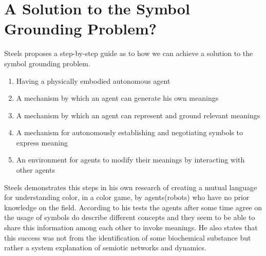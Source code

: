 \documentclass{article}
\begin{document}
	\section{A Solution to the Symbol Grounding Problem?}
	Steels proposes a step-by-step guide as to how we can achieve a solution to the symbol grounding problem.
	\begin{enumerate}
		\item Having a physically embodied autonomous agent
		\item A mechanism by which an agent can generate his own meanings
		\item A mechanism by which an agent can represent and ground relevant meanings
		\item A mechanism for autonomously establishing and negotiating symbols to express meaning
		\item An environment for agents to modify their meanings by interacting with other agents
	\end{enumerate}
	Steels demonstrates this steps in his own research of creating a mutual language for understanding color, in a color game, by agents(robots) who have no prior knowledge on the field. According to his tests the agents after some time agree on the usage of symbols do describe different concepts and they seem to be able to share this information among each other to invoke meanings. He also states that this success was not from the identification of some biochemical substance but rather a system explanation of semiotic networks and dynamics.
	
	
\end{document}
